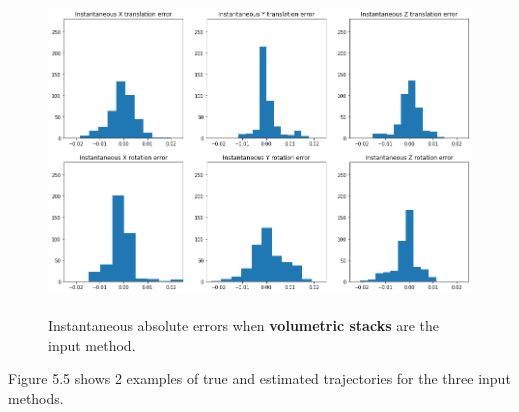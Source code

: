 \begin{figure}[H]
    \centering
    \includegraphics[width=\textwidth, height=3.35in]{images/result-examples/pose/errors/singlewarp-stack.png}
    \caption{Instantaneous absolute errors when \textbf{volumetric stacks} are the input method.}
\end{figure}

Figure 5.5 shows 2 examples of true and estimated trajectories for the three input methods. 

